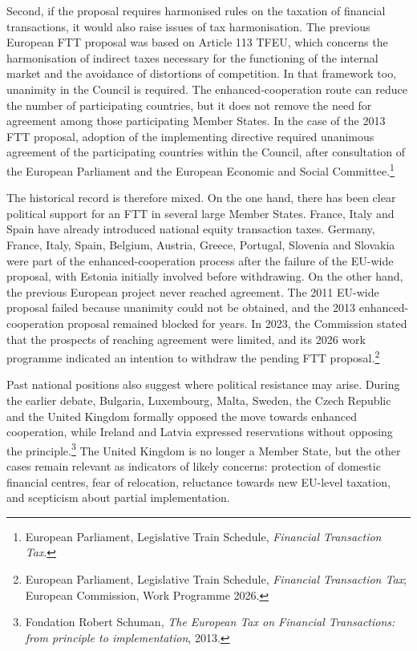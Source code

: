 \documentclass[../main]{subfiles}
\begin{document}
Second, if the proposal requires harmonised rules on the taxation of financial transactions, it would also raise issues of tax harmonisation. The previous European FTT proposal was based on Article 113 TFEU, which concerns the harmonisation of indirect taxes necessary for the functioning of the internal market and the avoidance of distortions of competition. In that framework too, unanimity in the Council is required. The enhanced-cooperation route can reduce the number of participating countries, but it does not remove the need for agreement among those participating Member States. In the case of the 2013 FTT proposal, adoption of the implementing directive required unanimous agreement of the participating countries within the Council, after consultation of the European Parliament and the European Economic and Social Committee.\footnote{European Parliament, Legislative Train Schedule, \textit{Financial Transaction Tax}.}

The historical record is therefore mixed. On the one hand, there has been clear political support for an FTT in several large Member States. France, Italy and Spain have already introduced national equity transaction taxes. Germany, France, Italy, Spain, Belgium, Austria, Greece, Portugal, Slovenia and Slovakia were part of the enhanced-cooperation process after the failure of the EU-wide proposal, with Estonia initially involved before withdrawing. On the other hand, the previous European project never reached agreement. The 2011 EU-wide proposal failed because unanimity could not be obtained, and the 2013 enhanced-cooperation proposal remained blocked for years. In 2023, the Commission stated that the prospects of reaching agreement were limited, and its 2026 work programme indicated an intention to withdraw the pending FTT proposal.\footnote{European Parliament, Legislative Train Schedule, \textit{Financial Transaction Tax}; European Commission, Work Programme 2026.}

Past national positions also suggest where political resistance may arise. During the earlier debate, Bulgaria, Luxembourg, Malta, Sweden, the Czech Republic and the United Kingdom formally opposed the move towards enhanced cooperation, while Ireland and Latvia expressed reservations without opposing the principle.\footnote{Fondation Robert Schuman, \textit{The European Tax on Financial Transactions: from principle to implementation}, 2013.} The United Kingdom is no longer a Member State, but the other cases remain relevant as indicators of likely concerns: protection of domestic financial centres, fear of relocation, reluctance towards new EU-level taxation, and scepticism about partial implementation.
\end{document}
